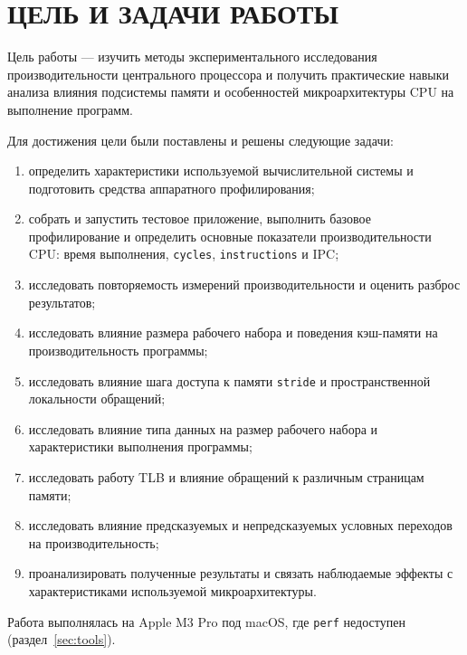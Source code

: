 \chapter*{ЦЕЛЬ И ЗАДАЧИ РАБОТЫ}

Цель работы --- изучить методы экспериментального исследования производительности центрального процессора и получить практические навыки анализа влияния подсистемы памяти и особенностей микроархитектуры CPU на выполнение программ.

Для достижения цели были поставлены и решены следующие задачи:
\begin{enumerate}
	\item определить характеристики используемой вычислительной системы и подготовить средства аппаратного профилирования;
	\item собрать и запустить тестовое приложение, выполнить базовое профилирование и определить основные показатели производительности CPU: время выполнения, \texttt{cycles}, \texttt{instructions} и IPC;
	\item исследовать повторяемость измерений производительности и оценить разброс результатов;
	\item исследовать влияние размера рабочего набора и поведения кэш-памяти на производительность программы;
	\item исследовать влияние шага доступа к памяти \texttt{stride} и пространственной локальности обращений;
	\item исследовать влияние типа данных на размер рабочего набора и характеристики выполнения программы;
	\item исследовать работу TLB и влияние обращений к различным страницам памяти;
	\item исследовать влияние предсказуемых и непредсказуемых условных переходов на производительность;
	\item проанализировать полученные результаты и связать наблюдаемые эффекты с характеристиками используемой микроархитектуры.
\end{enumerate}

Работа выполнялась на Apple M3 Pro под macOS, где \texttt{perf} недоступен (раздел~\ref{sec:tools}).
